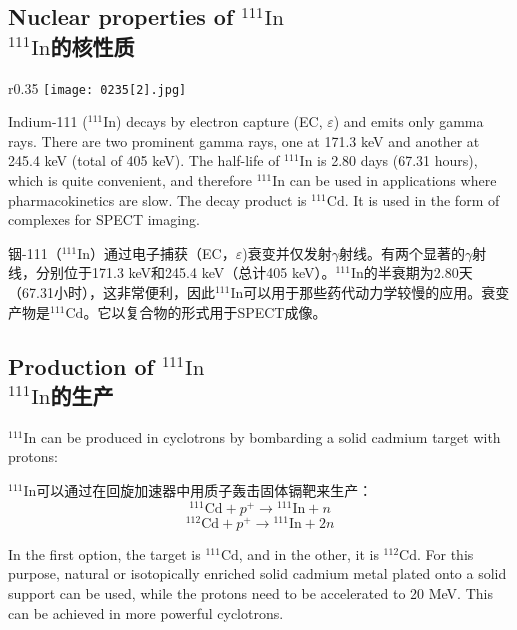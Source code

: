 \documentclass[dvipsnames, svgnames,a4paper,11pt]{article}
\begin{document}
\subsection{Nuclear properties of \(\mathrm{^{111}In}\)\\ \(\mathrm{^{111}In}\)的核性质}  

\begin{wrapfigure}{r}{0.35\textwidth}
    \centering
    \texttt{[image: 0235[2].jpg]}
     \label{fig313}
\end{wrapfigure}

Indium-111 (\(\mathrm{^{111}In}\)) decays by electron capture (EC, \(\varepsilon\)) and emits only gamma rays. There are two prominent gamma rays, one at 171.3 keV and another at 245.4 keV (total of 405 keV). The half-life of \(\mathrm{^{111}In}\) is 2.80 days (67.31 hours), which is quite convenient, and therefore \(\mathrm{^{111}In}\) can be used in applications where pharmacokinetics are slow. The decay product is \(\mathrm{^{111}Cd}\). It is used in the form of complexes for SPECT imaging.

铟-111（\(\mathrm{^{111}In}\)）通过电子捕获（EC，\(\varepsilon\))衰变并仅发射$\gamma$射线。有两个显著的$\gamma$射线，分别位于171.3 keV和245.4 keV（总计405 keV）。\(\mathrm{^{111}In}\)的半衰期为2.80天（67.31小时），这非常便利，因此\(\mathrm{^{111}In}\)可以用于那些药代动力学较慢的应用。衰变产物是\(\mathrm{^{111}Cd}\)。它以复合物的形式用于SPECT成像。



\subsection{Production of \(\mathrm{^{111}In}\)\\ \(\mathrm{^{111}In}\)的生产}  
\(\mathrm{^{111}In}\) can be produced in cyclotrons by bombarding a solid cadmium target with protons:  

\(\mathrm{^{111}In}\)可以通过在回旋加速器中用质子轰击固体镉靶来生产：  
\[\mathrm{^{111}Cd} + p^+ \rightarrow \mathrm{^{111}In} + n\]  
\[\mathrm{^{112}Cd} + p^+ \rightarrow \mathrm{^{111}In} + 2n\] 

In the first option, the target is \(\mathrm{^{111}Cd}\), and in the other, it is \(\mathrm{^{112}Cd}\). For this purpose, natural or isotopically enriched solid cadmium metal plated onto a solid support can be used, while the protons need to be accelerated to 20 MeV. This can be achieved in more powerful cyclotrons.
\end{document}
